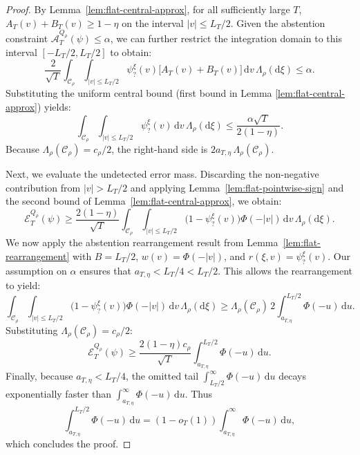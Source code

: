 \documentclass[10pt]{article}
\newcommand{\dd}{\mathrm{d}}
\theoremstyle{plain}
\begin{document}
\begin{proof}
By Lemma~\ref{lem:flat-central-approx}, for all sufficiently large $T$, $A_T(v)+B_T(v)\ge 1-\eta$ on the interval $|v|\le L_T/2$. Given the abstention constraint $\mathcal{A}_T^{Q_\rho}(\psi) \le \alpha$, we can further restrict the integration domain to this interval $[-L_T/2,L_T/2]$ to obtain:
$$ \frac{2}{\sqrt{T}} \int_{\mathcal{C}_\rho} \int_{|v|\le L_T/2} \psi_?^\xi(v) \bigl[A_T(v)+B_T(v)\bigr] \,\dd v\,\Lambda_\rho(\dd\xi) \le \alpha. $$
Substituting the uniform central bound (first bound in Lemma \ref{lem:flat-central-approx}) yields:
$$ \int_{\mathcal{C}_\rho} \int_{|v|\le L_T/2} \psi_?^\xi(v) \,\dd v\,\Lambda_\rho(\dd\xi) \le \frac{\alpha\sqrt{T}}{2(1-\eta)}. $$
Because $\Lambda_\rho(\mathcal{C}_\rho) = c_\rho/2$, the right-hand side is   $2a_{T,\eta}\,\Lambda_\rho(\mathcal{C}_\rho)$. 

Next, we evaluate the undetected error mass. Discarding the non-negative contribution from $|v|>L_T/2$ and applying Lemma~\ref{lem:flat-pointwise-sign} and the second bound of Lemma~\ref{lem:flat-central-approx}, we obtain:
$$ \mathcal{E}_T^{Q_\rho}(\psi) \ge \frac{2(1-\eta)}{\sqrt{T}} \int_{\mathcal{C}_\rho} \int_{|v|\le L_T/2} \bigl(1-\psi_?^\xi(v)\bigr)\Phi(-|v|) \,\dd v\,\Lambda_\rho(\dd\xi). $$
We now apply the abstention rearrangement result from Lemma~\ref{lem:flat-rearrangement} with $B=L_T/2$, $w(v)=\Phi(-|v|)$, and $r(\xi,v)=\psi_?^{\xi}(v)$. Our assumption on $\alpha$  ensures that $a_{T,\eta} < L_T/4 < L_T/2$. This allows the rearrangement to yield:
$$ \int_{\mathcal{C}_\rho} \int_{|v|\le L_T/2} \bigl(1-\psi_?^\xi(v)\bigr)\Phi(-|v|) \,\dd v\,\Lambda_\rho(\dd\xi) \ge \Lambda_\rho(\mathcal{C}_\rho) \,2\int_{a_{T,\eta}}^{L_T/2}\Phi(-u)\,\dd u. $$
Substituting $\Lambda_\rho(\mathcal{C}_\rho)=c_\rho/2$:
$$ \mathcal{E}_T^{Q_\rho}(\psi) \ge \frac{2(1-\eta)c_\rho}{\sqrt{T}} \int_{a_{T,\eta}}^{L_T/2}\Phi(-u)\,\dd u. $$
Finally, because $a_{T,\eta} < L_T/4$, the omitted tail $\int_{L_T/2}^\infty \Phi(-u)\,\dd u$ decays exponentially faster than $\int_{a_{T,\eta}}^\infty \Phi(-u)\,\dd u$. Thus
$$ \int_{a_{T,\eta}}^{L_T/2}\Phi(-u)\,\dd u = (1-o_T(1)) \int_{a_{T,\eta}}^\infty \Phi(-u)\,\dd u, $$
which concludes the proof.  
\end{proof}
\end{document}
